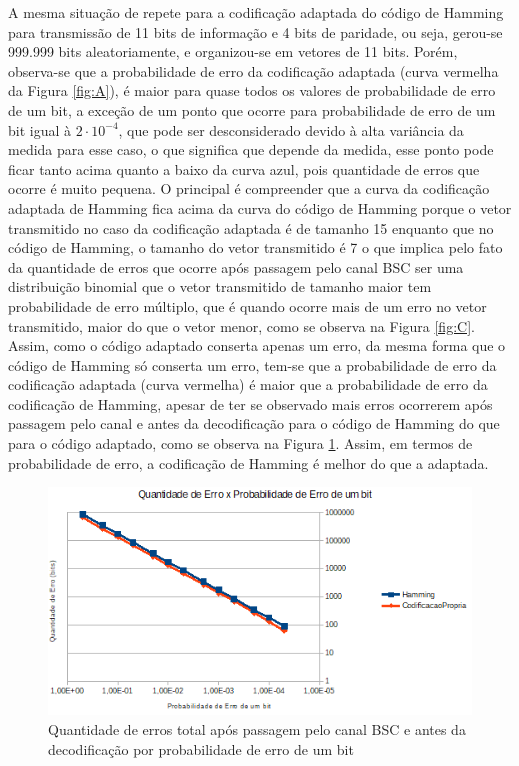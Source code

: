 \documentclass[journal,comsoc]{IEEEtran}
\begin{document}
		A mesma situação de repete para a codificação adaptada do código de Hamming para transmissão de 11 bits de informação e 4 bits de paridade, ou seja, gerou-se 999.999 bits	aleatoriamente, e organizou-se em vetores de 11 bits. Porém, observa-se que a probabilidade de erro da codificação adaptada (curva vermelha da Figura \ref{fig:A}), é maior para quase todos os valores de probabilidade de erro de um bit, a exceção	de um ponto que ocorre para probabilidade de erro de um bit	igual à $2\cdot 10^{-4}$, que pode ser desconsiderado devido à alta variância da medida para esse caso, o que significa que depende da medida, esse ponto pode ficar tanto acima quanto a baixo da curva azul, pois quantidade de erros que ocorre é muito pequena. O principal é compreender que a curva da codificação adaptada de Hamming fica acima da curva do código de Hamming porque o vetor transmitido no caso da codificação adaptada é de tamanho 15 enquanto que no código de Hamming, o tamanho do vetor transmitido é 7 o que implica pelo fato da quantidade de erros que ocorre após	passagem pelo canal BSC ser uma distribuição binomial que o vetor transmitido de tamanho maior tem probabilidade de erro múltiplo, que é quando ocorre mais de um erro no vetor	transmitido, maior do que o vetor menor, como se observa na	Figura \ref{fig:C}. Assim, como o código adaptado conserta apenas um erro, da mesma forma que o código de Hamming só conserta um erro, tem-se que a probabilidade de erro da codificação adaptada (curva vermelha) é maior que a probabilidade de erro da codificação de Hamming, apesar de ter se observado mais erros ocorrerem após passagem pelo canal e antes da decodificação para o código de Hamming do que para o código adaptado, como se observa na Figura \ref{fig:B}. Assim, em termos de probabilidade de erro, a codificação de Hamming é melhor do que a adaptada.
		
		\begin{figure}[hbt]
			\centering
			\includegraphics[width=\columnwidth]{../img/QuantErroXp.png}%
			\caption{Quantidade de erros total após passagem pelo canal BSC e antes da decodificação por probabilidade de erro de um bit}%
			\label{fig:B}%
		\end{figure}
				
\end{document}
